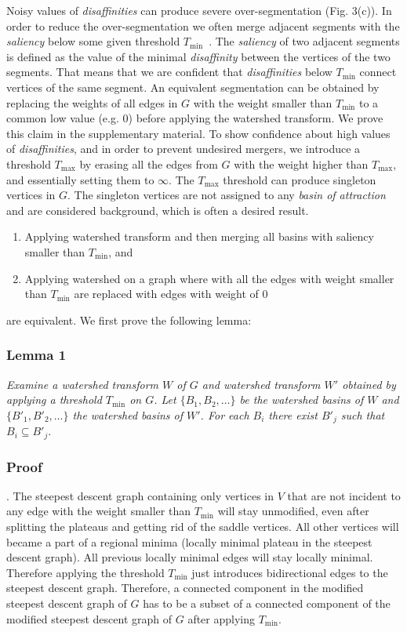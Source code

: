 \documentclass[10pt, conference, compsocconf]{IEEEtran}
\begin{document}
 Noisy values of \emph{disaffinities} can produce severe
 over-segmentation (Fig. 3(c)). In order to reduce the
 over-segmentation we often merge adjacent segments with the
 \emph{saliency} below some given threshold
 $T_{\min}$~\cite{Najman1996}. The \emph{saliency} of two adjacent
 segments is defined as the value of the minimal \emph{disaffinity}
 between the vertices of the two segments. That means that we are
 confident that \emph{disaffinities} below $T_{\min}$ connect vertices
 of the same segment. An equivalent segmentation can be obtained by
 replacing the weights of all edges in $G$ with the weight smaller
 than $T_{\min}$ to a common low value (e.g. $0$) before applying the
 watershed transform. We prove this claim in the supplementary
 material. To show confidence about high values of
 \emph{disaffinities}, and in order to prevent undesired mergers, we
 introduce a threshold $T_{\max}$ by erasing all the edges from $G$
 with the weight higher than $T_{\max}$, and essentially setting them
 to $\infty$. The $T_{\max}$ threshold can produce singleton vertices
 in $G$. The singleton vertices are not assigned to any \emph{basin of
   attraction} and are considered background, which is often a desired
 result.

\begin{enumerate}
\item Applying watershed transform and then merging all basins with
  saliency smaller than $T_{\min}$, and
\item Applying watershed on a graph where with all the edges with
  weight smaller than $T_{\min}$ are replaced with edges with weight
  of $0$
\end{enumerate}
are equivalent. We first prove the following lemma:

\subsubsection{Lemma 1}
\emph{Examine a watershed transform $W$ of $G$ and watershed transform
  $W'$ obtained by applying a threshold $T_{\min}$ on $G$. Let
  $\{B_1,B_2,\dots\}$ be the watershed basins of $W$ and
  $\{B'_1,B'_2,\dots\}$ the watershed basins of $W'$. For each $B_i$
  there exist $B'_j$ such that $B_i \subseteq B'_j$}.


\subsubsection{Proof}.
The steepest descent graph containing only vertices in $V$ that are
not incident to any edge with the weight smaller than $T_{\min}$ will
stay unmodified, even after splitting the plateaus and getting rid of
the saddle vertices. All other vertices will became a part of a
regional minima (locally minimal plateau in the steepest descent
graph). All previous locally minimal edges will stay locally
minimal. Therefore applying the threshold $T_{\min}$ just introduces
bidirectional edges to the steepest descent graph. Therefore, a
connected component in the modified steepest descent graph of $G$ has
to be a subset of a connected component of the modified steepest
descent graph of $G$ after applying $T_{\min}$.
\end{document}
